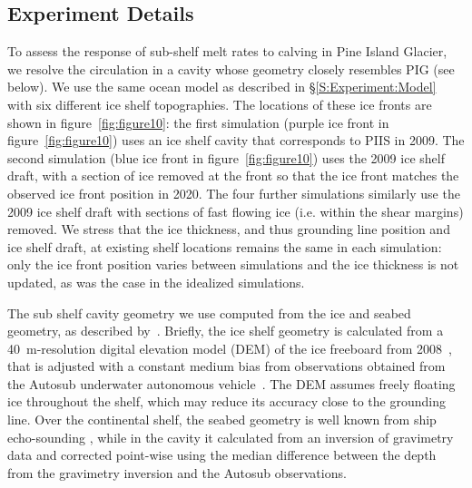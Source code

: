 \documentclass[draft]{agujournal2019}
\begin{document}
\subsection{Experiment Details}
To assess the response of sub-shelf melt rates to calving in Pine Island Glacier, we resolve the circulation in a cavity whose geometry closely resembles PIG (see below). We use the same ocean model as described in \S\ref{S:Experiment:Model} with six different ice shelf topographies. The locations of these ice fronts are shown in figure~\ref{fig:figure10}: the first simulation (purple ice front in figure~\ref{fig:figure10}) uses an ice shelf cavity that corresponds to PIIS in 2009. The second simulation (blue ice front in figure~\ref{fig:figure10}) uses the 2009 ice shelf draft, with a section of ice removed at the front so that the ice front matches the observed ice front position in 2020. The four further simulations similarly use the 2009 ice shelf draft with sections of fast flowing ice (i.e. within the shear margins) removed. We stress that the ice thickness, and thus grounding line position and ice shelf draft, at existing shelf locations remains the same in each simulation: only the ice front position varies between simulations and the ice thickness is not updated, as was the case in the idealized simulations.  %

The sub shelf cavity geometry we use computed from the ice and seabed geometry, as described by~. Briefly, the ice shelf geometry is calculated from a 40~m-resolution digital elevation model (DEM) of the ice freeboard from 2008~\cite{Korona2009Photogrammetry}, that is adjusted with a constant medium bias from observations obtained from the Autosub underwater autonomous vehicle~\cite{Jenkins2010NatureGeo}. The DEM assumes freely floating ice throughout the shelf, which may reduce its accuracy close to the grounding line. Over the continental shelf, the seabed geometry is well known from ship echo-sounding \cite{Dutrieux2014Science}, while in the cavity it calculated from an inversion of gravimetry data and corrected point-wise using the median difference between the depth from the gravimetry inversion and the Autosub observations. 
\end{document}
